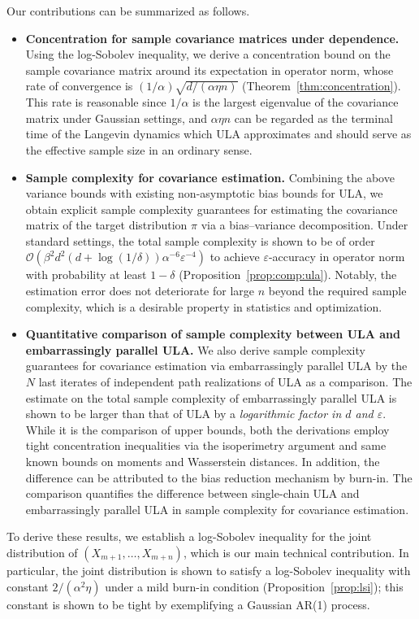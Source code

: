 \documentclass[12pt,reqno]{amsart}
\theoremstyle{remark}
\theoremstyle{definition}
\newcommand{\calO}{\mathcal{O}}
\renewcommand{\epsilon}{\varepsilon}
\begin{document}
Our contributions can be summarized as follows.
\begin{itemize}
    \item \textbf{Concentration for sample covariance matrices under dependence.}
    Using the log-Sobolev inequality, we derive a concentration bound on the sample covariance matrix around its expectation in operator norm, whose rate of convergence is $(1/\alpha)\sqrt{d/(\alpha \eta n)}$ (Theorem~\ref{thm:concentration}).
    This rate is reasonable since $1/\alpha$ is the largest eigenvalue of the covariance matrix under Gaussian settings, and $\alpha \eta n$ can be regarded as the terminal time of the Langevin dynamics which ULA approximates and should serve as the effective sample size in an ordinary sense.
    \item \textbf{Sample complexity for covariance estimation.}
    Combining the above variance bounds with existing non-asymptotic bias bounds for ULA, we obtain explicit sample complexity guarantees for estimating the covariance matrix of the target distribution $\pi$ via a bias--variance decomposition.
    Under standard settings, the total sample complexity is shown to be of order $\calO(\beta^{2}d^{2}(d+\log(1/\delta))\alpha^{-6}\epsilon^{-4})$ to achieve $\epsilon$-accuracy in operator norm with probability at least $1-\delta$ (Proposition~\ref{prop:comp:ula}).
    Notably, the estimation error does not deteriorate for large $n$ beyond the required sample complexity, which is a desirable property in statistics and optimization.

    \item \textbf{Quantitative comparison of sample complexity between ULA and embarrassingly parallel ULA.}
    We also derive sample complexity guarantees for covariance estimation via embarrassingly parallel ULA by the $N$ last iterates of independent path realizations of ULA as a comparison.
    The estimate on the total sample complexity of embarrassingly parallel ULA is shown to be larger than that of ULA by a \emph{logarithmic factor in $d$ and $\epsilon$}.
    While it is the comparison of upper bounds, both the derivations employ tight concentration inequalities via the isoperimetry argument and same known bounds on moments and Wasserstein distances.
    In addition, the difference can be attributed to the bias reduction mechanism by burn-in.
    The comparison quantifies the difference between single-chain ULA and embarrassingly parallel ULA in sample complexity for covariance estimation.
\end{itemize}
To derive these results, we establish a log-Sobolev inequality for the joint distribution of $(X_{m+1},\ldots,X_{m+n})$, which is our main technical contribution.
In particular, the joint distribution is shown to satisfy a log-Sobolev inequality with constant $2/(\alpha^{2}\eta)$ under a mild burn-in condition (Proposition~\ref{prop:lsi}); this constant is shown to be tight by exemplifying a Gaussian AR(1) process.
\end{document}
